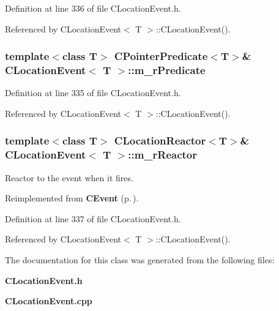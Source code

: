 Definition at line 336 of file CLocation\-Event.h.

Referenced by CLocation\-Event$<$ T $>$::CLocation\-Event().
\subsubsection{\setlength{\rightskip}{0pt plus 5cm}template$<$class T$>$ {\bf CPointer\-Predicate}$<$T$>$\& CLocation\-Event$<$ T $>$::m\_\-r\-Predicate\hspace{0.3cm}{\tt  [private]}}\label{classCLocationEvent_o0}




Definition at line 335 of file CLocation\-Event.h.

Referenced by CLocation\-Event$<$ T $>$::CLocation\-Event().
\subsubsection{\setlength{\rightskip}{0pt plus 5cm}template$<$class T$>$ {\bf CLocation\-Reactor}$<$T$>$\& CLocation\-Event$<$ T $>$::m\_\-r\-Reactor\hspace{0.3cm}{\tt  [private]}}\label{classCLocationEvent_o2}


Reactor to the event when it fires.



Reimplemented from {\bf CEvent} {\rm (p.\,\pageref{classCEvent_o5})}.

Definition at line 337 of file CLocation\-Event.h.

Referenced by CLocation\-Event$<$ T $>$::CLocation\-Event().

The documentation for this class was generated from the following files:\begin{CompactItemize}
\item 
{\bf CLocation\-Event.h}\item 
{\bf CLocation\-Event.cpp}\end{CompactItemize}
